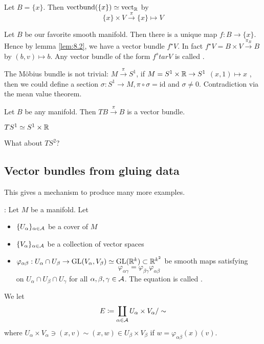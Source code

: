 \begin{example}
    Let \(B=\{x\}\). Then \(\text{vectbund}(\{x\})\simeq \text{vect}_{\mathbb{R}}\) by 
    \[\{x\}\times V \stackrel{\pi}{\to} \{x\}\mapsto V\] %
\end{example}

\begin{example}
    Let \(B\) be our favorite smooth manifold. Then there is a unique map \(f:B\to \{x\}\).
    Hence by lemma \ref{lem:8.2}, we have a vector bundle \(f^\star V\). In fact 
    \(f^\star V= B\times V\stackrel{\pi_B}{\to} B\) by \((b,v)\mapsto b\).
    Any vector bundle of the form \(f^star V\) is called . 
\end{example}

\begin{remark}
    The Möbius bundle is not trivial:
    \(M\stackrel{\pi}{\to} S^1\), if \(M=S^1 \times \mathbb{R}\to S^1\)  \((x,1)\mapsto x\) %
    , then we could define a section \(\sigma:S^1\to M,\pi\circ \sigma=\text{id}\) and \(\sigma\neq 0\).
    Contradiction via the mean value theorem.
\end{remark}

\begin{example}
    Let \(B\) be any manifold. Then \(TB\stackrel{\pi}{\to} B\) is a vector bundle.
\end{example}

 \(T S^1\simeq S^1\times \mathbb{R}\) 

What about \(TS^2\)?

\subsection{Vector bundles from gluing data}

This gives a mechanism to produce many more examples.

: %
Let \(M\) be a manifold. Let 
\begin{itemize}
    \item \(\{U_\alpha\}_{\alpha\in \mathcal{A}}\) be a cover of \(M\)
    \item \(\{V_\alpha\}_{\alpha\in \mathcal{A}}\) be a collection of vector spaces 
    \item \(\varphi_{\alpha\beta}:U_\alpha\cap U_\beta\to \text{GL}(V_\alpha,V_\beta)\simeq \text{GL}(\mathbb{R}^k)\subset \mathbb{R}^{k^2}\) be 
          smooth maps satisfying \[\varphi_{\alpha\gamma}=\varphi_{\beta\gamma}\varphi_{\alpha\beta}\] on  \(U_\alpha\cap U_\beta\cap U_\gamma\) for all \(\alpha,\beta,\gamma\in\mathcal{A}\). 
          The equation is called .
\end{itemize}
We let \begin{equation}
    E\coloneqq \coprod_{\alpha\in\mathcal{A}} U_\alpha \times V_\alpha /\sim     
\end{equation}
where \(U_{\alpha}\times V_\alpha \ni (x,v)\sim (x,w)\in U_\beta\times V_\beta\)
if \(w=\varphi_{\alpha\beta}(x)(v)\).

